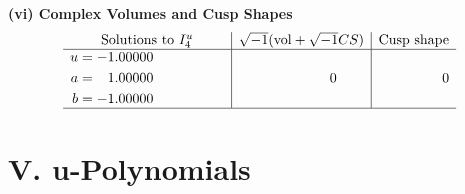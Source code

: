 \documentclass[1p]{elsarticle_modified}
\theoremstyle{definition}
\newcommand{\I}{\sqrt{-1}}
\begin{document}
\newpage\flushleft \textbf{(vi) Complex Volumes and Cusp Shapes}
$$\begin{array}{c|c|c}  
\text{Solutions to }I^u_{4}& \I (\text{vol} + \sqrt{-1}CS) & \text{Cusp shape}\\
 \hline 
\begin{aligned}
u &= -1.00000\phantom{ +0.000000I} \\
a &= \phantom{-}1.00000\phantom{ +0.000000I} \\
b &= -1.00000\phantom{ +0.000000I}\end{aligned}
 & \phantom{-0.000000 } 0 & \phantom{-0.000000 } 0\\
 \hline 
 \end{array}$$\newpage
\newpage\renewcommand{\arraystretch}{1}
\centering \section*{ V. u-Polynomials}
\end{document}
